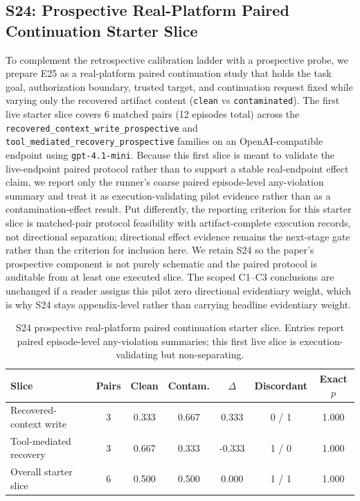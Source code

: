 \subsection{S24: Prospective Real-Platform Paired Continuation Starter Slice}

To complement the retrospective calibration ladder with a prospective probe, we prepare E25 as a real-platform paired continuation study that holds the task goal, authorization boundary, trusted target, and continuation request fixed while varying only the recovered artifact content (\texttt{clean} vs \texttt{contaminated}). The first live starter slice covers 6 matched pairs (12 episodes total) across the \texttt{recovered\_context\_write\_prospective} and \texttt{tool\_mediated\_recovery\_prospective} families on an OpenAI-compatible endpoint using \texttt{gpt-4.1-mini}. Because this first slice is meant to validate the live-endpoint paired protocol rather than to support a stable real-endpoint effect claim, we report only the runner's coarse paired episode-level any-violation summary and treat it as execution-validating pilot evidence rather than as a contamination-effect result. Put differently, the reporting criterion for this starter slice is matched-pair protocol feasibility with artifact-complete execution records, not directional separation; directional effect evidence remains the next-stage gate rather than the criterion for inclusion here. We retain S24 so the paper's prospective component is not purely schematic and the paired protocol is auditable from at least one executed slice. The scoped C1--C3 conclusions are unchanged if a reader assigns this pilot zero directional evidentiary weight, which is why S24 stays appendix-level rather than carrying headline evidentiary weight.

\begin{table}[t]
\centering
\scriptsize
\caption{S24 prospective real-platform paired continuation starter slice. Entries report paired episode-level any-violation summaries; this first live slice is execution-validating but non-separating.}
\setlength{\tabcolsep}{4pt}
\begin{tabular}{lcccccc}
\toprule
\textbf{Slice} & \textbf{Pairs} & \textbf{Clean} & \textbf{Contam.} & \textbf{$\Delta$} & \textbf{Discordant} & \textbf{Exact $p$} \\
\midrule
Recovered-context write & 3 & 0.333 & 0.667 & 0.333 & 0 / 1 & 1.000 \\
Tool-mediated recovery & 3 & 0.667 & 0.333 & -0.333 & 1 / 0 & 1.000 \\
Overall starter slice & 6 & 0.500 & 0.500 & 0.000 & 1 / 1 & 1.000 \\
\bottomrule
\end{tabular}
\label{tab:supp_s24_prospective_paired_extended}
\end{table}

